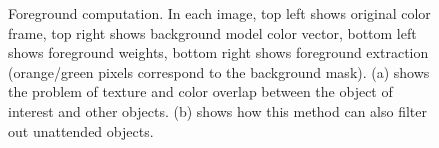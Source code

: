 \documentclass[10pt,letterpaper]{article}
\begin{document}
\begin{figure}[t]
     \begin{center}
        \end{center}
    \caption{Foreground computation. In each image, top left shows original color frame, top right shows  background model color vector, bottom left shows foreground weights, bottom right shows foreground extraction (orange/green pixels correspond to the background mask). (a) shows the problem of texture and color overlap between the object of interest and other objects. (b) shows how this method can also filter out unattended objects.}
   \label{fig:objects}
\end{figure}
\end{document}
